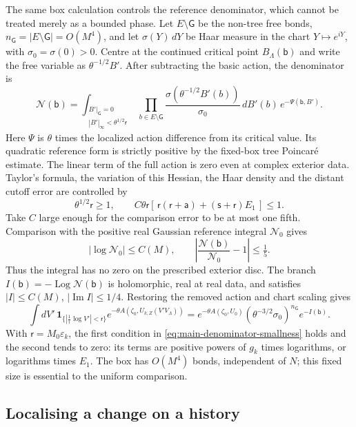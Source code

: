 \documentclass[11pt,letterpaper,reqno]{amsart}
\theoremstyle{definition}
\theoremstyle{remark}
\begin{document}
The same box calculation controls the reference denominator,
which cannot be treated merely as a bounded phase.
Let \(E\setminus\mathsf G\) be the non-tree free bonds,
\(n_{\mathsf G}=|E\setminus\mathsf G|=O(M^4)\), and
let \(\sigma(Y)\,dY\) be Haar measure in the chart
\(Y\mapsto e^{iY}\), with \(\sigma_0=\sigma(0)>0\).
Centre at the continued critical point \(B_\Lambda(\mathsf b)\)
and write the free variable as \(\theta^{-1/2}B'\).
After subtracting the basic action, the denominator is
\[
 \mathcal N(\mathsf b)=
 \int_{\substack{B'|_{\mathsf G}=0\\|B'|_\infty<\theta^{1/2}\mathsf r}}
 \prod_{b\in E\setminus\mathsf G}
       \frac{\sigma(\theta^{-1/2}B'(b))}{\sigma_0}\,dB'(b)\,
       e^{-\Psi(\mathsf b,B')}.
\]
Here \(\Psi\) is \(\theta\) times the localized action
difference from its critical value. Its quadratic
reference form is strictly positive by the fixed-box
tree Poincar\'e estimate. The linear term of the full
action is zero even at complex exterior data.
Taylor's formula, the variation of this Hessian, the
Haar density and the distant cutoff error are controlled
by
\begin{equation}\label{eq:main-denominator-smallness}
 \theta^{1/2}\mathsf r\ge1,\qquad
 C\theta\mathsf r
   [\,\mathsf r(\mathsf r+\mathsf a)
                      +(\mathsf s+\mathsf r)E_1\,]\le1.
\end{equation}
Take \(C\) large enough for the comparison error to be
at most one fifth. Comparison with the positive real
Gaussian reference integral \(\mathcal N_0\) gives
\[
 |\log\mathcal N_0|\le C(M),\qquad
 \left|\frac{\mathcal N(\mathsf b)}{\mathcal N_0}-1\right|
       \le\tfrac15.
\]
Thus the integral has no zero on the prescribed exterior
disc. The branch
\(I(\mathsf b)=-\operatorname{Log}\mathcal N(\mathsf b)\)
is holomorphic, real at real data, and satisfies
\(|I|\le C(M)\), \(|\operatorname{Im}I|\le1/4\).
Restoring the removed action and chart scaling gives
\[
 \int dV'\,
       \mathbf1_{\{|\frac1i\log V'|<\mathsf r\}}
       e^{-\theta A(\zeta_0,U_{k,Z}(V'V_\Lambda))}
 =e^{-\theta A(\zeta_0,U_0)}
       (\theta^{-3/2}\sigma_0)^{n_{\mathsf G}}e^{-I(\mathsf b)}.
\]
With \(\mathsf r=M_0\varepsilon_k\), the first condition
in \eqref{eq:main-denominator-smallness} holds and the
second tends to zero: its terms are positive powers
of \(g_k\) times logarithms, or logarithms times \(E_1\).
The box has \(O(M^4)\) bonds, independent of \(N\);
this fixed size is essential to the uniform comparison.

\subsection{Localising a change on a history}
\end{document}
